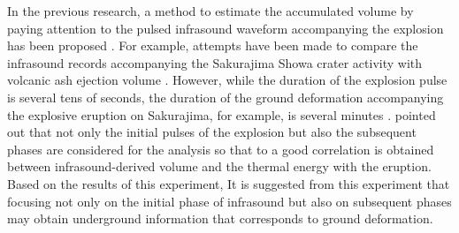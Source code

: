\documentclass[12pt]{article}
\begin{document}
In the previous research, a method to estimate the accumulated volume by paying attention to the pulsed infrasound waveform accompanying the explosion has been proposed \citep{Johnson2003}.
For example, attempts have been made to compare the infrasound records accompanying the Sakurajima Showa crater activity with volcanic ash ejection volume \citep{Fee2017a}.
However, while the duration of the explosion pulse is several tens of seconds, the duration of the ground deformation accompanying the explosive eruption on Sakurajima, for example, is several minutes \citep{Iguchi2012, Iguchi2013a}.
\cite{DelleDonne2016} pointed out that not only the initial pulses of the explosion but also the subsequent phases are considered for the analysis so that to a good correlation is obtained between infrasound-derived volume and the thermal energy with the eruption.
Based on the results of this experiment, It is suggested from this experiment that focusing not only on the initial phase of infrasound but also on subsequent phases may obtain underground information that corresponds to ground deformation.


\clearpage \newpage

 
\end{document}
